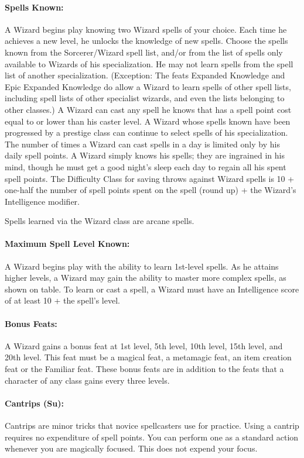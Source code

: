 \paragraph{Spells Known:} A Wizard begins play knowing two Wizard spells of your choice. 
Each time he achieves a new level, he unlocks the knowledge of new spells.
Choose the spells known from the Sorcerer/Wizard spell list, and/or from the list of spells only available to Wizards of his specialization. He may not learn spells from the spell list of another specialization. (Exception: The feats Expanded Knowledge and Epic Expanded Knowledge do allow a Wizard to learn spells of other spell lists, including spell lists of other specialist wizards, and even the lists belonging to other classes.) 
A Wizard can cast any spell he knows that has a spell point cost equal to or lower than his caster level. A Wizard whose spells known have been progressed by a prestige class can continue to select spells of his specialization.
The number of times a Wizard can cast spells in a day is limited only by his daily spell points. 
A Wizard simply knows his spells; they are ingrained in his mind, though he must get a good night's sleep each day to regain all his spent spell points.
The Difficulty Class for saving throws against Wizard spells is 10 + one-half the number of spell points spent on the spell (round up) + the Wizard's Intelligence modifier. 

Spells learned via the Wizard class are arcane spells.
\paragraph{Maximum Spell Level Known:} A Wizard begins play with the ability to learn 1st-level spells. 
As he attains higher levels, a Wizard may gain the ability to master more complex spells, as shown on  table.
To learn or cast a spell, a Wizard must have an Intelligence score of at least 10 + the spell's level.
\paragraph{Bonus Feats:} A Wizard gains a bonus feat at 1st level, 5th level, 10th level, 15th level, and 20th level. 
This feat must be a magical feat, a metamagic feat, an item creation feat or the Familiar feat.
These bonus feats are in addition to the feats that a character of any class gains every three levels. 

\paragraph[Cantrips]{Cantrips (Su):}
\label{sec:Cantrips}
Cantrips are minor tricks that novice spellcasters use for practice.
Using a cantrip requires no expenditure of spell points.
You can perform one as a standard action whenever you are magically focused.
This does not expend your focus.


